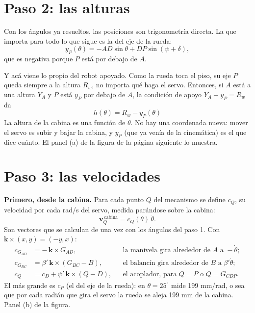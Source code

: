 \documentclass[11pt,a4paper]{article}
\begin{document}
\section{Paso 2: las alturas}

Con los ángulos ya resueltos, las posiciones son trigonometría directa. La que importa para todo lo que sigue
es la del eje de la rueda:
\begin{equation}
y_P(\theta)=-AD\sin\theta+DP\sin(\psi+\delta),
\label{eq:yP}
\end{equation}
que es negativa porque \(P\) está por debajo de \(A\).

Y acá viene lo propio del robot apoyado. Como la rueda toca el piso, su eje \(P\) queda siempre a la altura
\(R_w\), no importa qué haga el servo. Entonces, si \(A\) está a una altura \(Y_A\) y \(P\) está \(y_P\) por
debajo de \(A\), la condición de apoyo \(Y_A+y_P=R_w\) da
\begin{equation}
\boxed{\;h(\theta)=R_w-y_P(\theta)\;}
\label{eq:h}
\end{equation}
La altura de la cabina es una función de \(\theta\). No hay una coordenada nueva: mover el servo es subir y
bajar la cabina, y \(y_P\) (que ya venía de la cinemática) es el que dice cuánto. El panel (a) de la figura de
la página siguiente lo muestra.

\section{Paso 3: las velocidades}

\textbf{Primero, desde la cabina.} Para cada punto \(Q\) del mecanismo se define \(c_Q\), su velocidad por
cada rad/s del servo, medida parándose sobre la cabina:
\begin{equation}
\mathbf{v}^{\,\text{cabina}}_Q=c_Q(\theta)\,\dot\theta .
\label{eq:cQ}
\end{equation}
Son vectores que se calculan de una vez con los ángulos del paso 1. Con \(\mathbf{k}\times(x,y)=(-y,x)\):
\begin{align}
c_{G_{AD}}&=-\,\mathbf{k}\times G_{AD}, & &\text{la manivela gira alrededor de } A \text{ a } -\dot\theta; \label{eq:cAD}\\
c_{G_{BC}}&=\beta'\,\mathbf{k}\times(G_{BC}-B), & &\text{el balancín gira alrededor de } B \text{ a } \beta'\dot\theta; \label{eq:cBC}\\
c_Q&=c_D+\psi'\,\mathbf{k}\times(Q-D), & &\text{el acoplador, para } Q=P \text{ o } Q=G_{CDP}. \label{eq:cCDP}
\end{align}
El más grande es \(c_P\) (el del eje de la rueda): en \(\theta=25^\circ\) mide 199 mm/rad, o sea que por cada
radián que gira el servo la rueda se aleja 199 mm de la cabina. Panel (b) de la figura.
\end{document}
